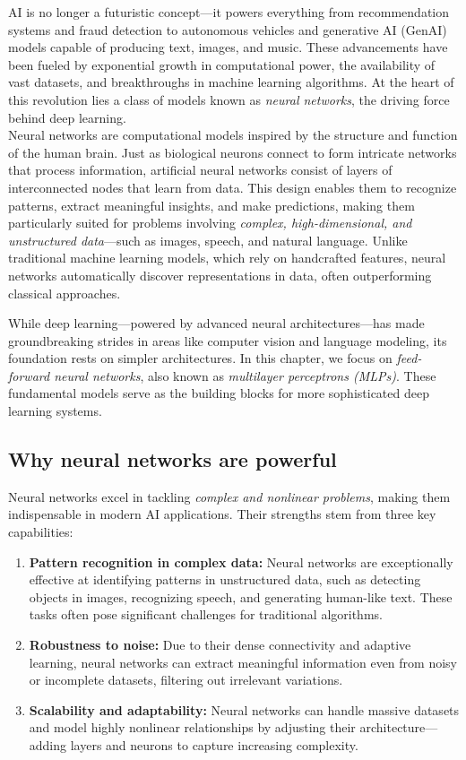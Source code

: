 \documentclass[
  11pt,
]{book}
\theoremstyle{definition}
\theoremstyle{definition}
\theoremstyle{definition}
\theoremstyle{definition}
\theoremstyle{remark}
\begin{document}
AI is no longer a futuristic concept---it powers everything from recommendation systems and fraud detection to autonomous vehicles and generative AI (GenAI) models capable of producing text, images, and music. These advancements have been fueled by exponential growth in computational power, the availability of vast datasets, and breakthroughs in machine learning algorithms. At the heart of this revolution lies a class of models known as \emph{neural networks}, the driving force behind deep learning.\\
Neural networks are computational models inspired by the structure and function of the human brain. Just as biological neurons connect to form intricate networks that process information, artificial neural networks consist of layers of interconnected nodes that learn from data. This design enables them to recognize patterns, extract meaningful insights, and make predictions, making them particularly suited for problems involving \emph{complex, high-dimensional, and unstructured data}---such as images, speech, and natural language. Unlike traditional machine learning models, which rely on handcrafted features, neural networks automatically discover representations in data, often outperforming classical approaches.

While deep learning---powered by advanced neural architectures---has made groundbreaking strides in areas like computer vision and language modeling, its foundation rests on simpler architectures. In this chapter, we focus on \emph{feed-forward neural networks}, also known as \emph{multilayer perceptrons (MLPs)}. These fundamental models serve as the building blocks for more sophisticated deep learning systems.

\subsection*{Why neural networks are powerful}\label{why-neural-networks-are-powerful}


Neural networks excel in tackling \emph{complex and nonlinear problems}, making them indispensable in modern AI applications. Their strengths stem from three key capabilities:

\begin{enumerate}
\def\labelenumi{\arabic{enumi}.}
\item
  \textbf{Pattern recognition in complex data:} Neural networks are exceptionally effective at identifying patterns in unstructured data, such as detecting objects in images, recognizing speech, and generating human-like text. These tasks often pose significant challenges for traditional algorithms.
\item
  \textbf{Robustness to noise:} Due to their dense connectivity and adaptive learning, neural networks can extract meaningful information even from noisy or incomplete datasets, filtering out irrelevant variations.
\item
  \textbf{Scalability and adaptability:} Neural networks can handle massive datasets and model highly nonlinear relationships by adjusting their architecture---adding layers and neurons to capture increasing complexity.
\end{enumerate}
\end{document}
